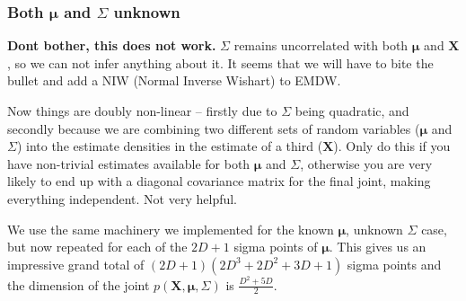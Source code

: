 \subsubsection{Both $\mathbf{\mu}$ and $\Sigma$ unknown}

\textbf{Dont bother, this does not work.} $\Sigma$ remains uncorrelated
with both $\mathbf{\mu}$ and $\mathbf{X}$, so we can not infer anything
about it. It seems that we will have to bite the bullet and add a
NIW (Normal Inverse Wishart) to EMDW.

Now things are doubly non-linear -- firstly due to $\Sigma$ being
quadratic, and secondly because we are combining two different sets
of random variables ($\mathbf{\mu}$ and $\Sigma$) into the estimate
densities in the estimate of a third ($\mathbf{X}$). Only do this
if you have non-trivial estimates available for both $\mathbf{\mu}$
and $\Sigma$, otherwise you are very likely to end up with a diagonal
covariance matrix for the final joint, making everything independent.
Not very helpful.

We use the same machinery we implemented for the known $\mathbf{\mu}$,
unknown $\Sigma$ case, but now repeated for each of the $2D+1$ sigma
points of $\mathbf{\mu}$. This gives us an impressive grand total
of $(2D+1)(2D^{3}+2D^{2}+3D+1)$ sigma points and the dimension of
the joint $p(\mathbf{X},\mathbf{\mu},\Sigma)$ is $\frac{D^{2}+5D}{2}$.
